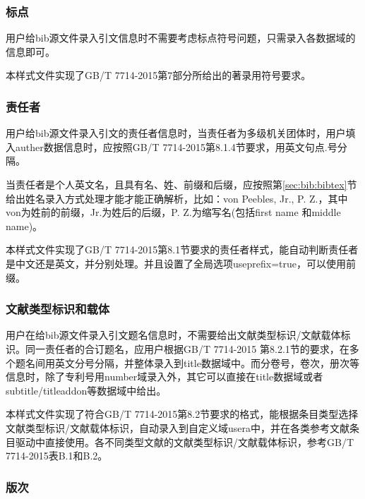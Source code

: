 \subsubsection{标点}

\begin{property}{}{}
用户给bib源文件录入引文信息时不需要考虑标点符号问题，只需录入各数据域的信息即可。

本样式文件实现了GB/T 7714-2015第7部分所给出的著录用符号要求。
\end{property}

\subsubsection{责任者}

\begin{property}{}{}
用户给bib源文件录入引文的责任者信息时，当责任者为多级机关团体时，用户填入auther数据信息时，应按照GB/T 7714-2015第8.1.4节要求，用英文句点.号分隔。

当责任者是个人英文名，且具有名、姓、前缀和后缀，应按照第\ref{sec:bib:bibtex}节给出姓名录入方式处理才能才能正确解析，比如：von Peebles, Jr., P. Z.，其中von为姓前的前缀，Jr.为姓后的后缀，P. Z.为缩写名(包括first name 和middle name)。

本样式文件实现了GB/T 7714-2015第8.1节要求的责任者样式，能自动判断责任者是中文还是英文，并分别处理。并且设置了全局选项useprefix=true，可以使用前缀。
\end{property}

\subsubsection{文献类型标识和载体}

\begin{property}{}{}
用户在给bib源文件录入引文题名信息时，不需要给出文献类型标识/文献载体标识。同一责任者的合订题名，应用户根据GB/T 7714-2015 第8.2.1节的要求，在多个题名间用英文分号分隔，并整体录入到title数据域中。而分卷号，卷次，册次等信息时，除了专利号用number域录入外，其它可以直接在title数据域或者subtitle/titleaddon等数据域中给出。

本样式文件实现了符合GB/T 7714-2015第8.2节要求的格式，能根据条目类型选择文献类型标识/文献载体标识，自动录入到自定义域usera中，并在各类参考文献条目驱动中直接使用。各不同类型文献的文献类型标识/文献载体标识，参考GB/T 7714-2015表B.1和B.2。
\end{property}

\subsubsection{版次}\label{sec:fmt:edition}

